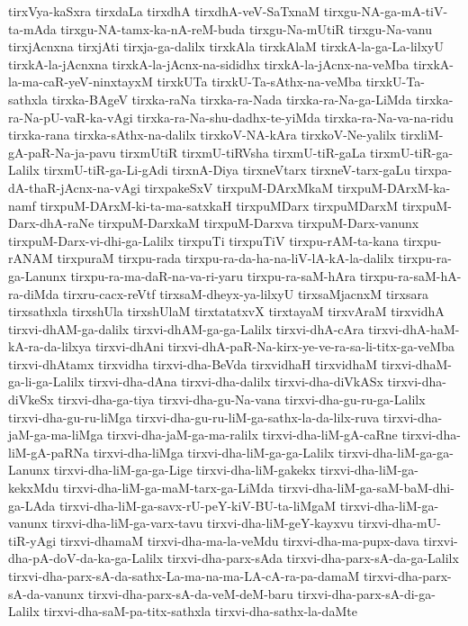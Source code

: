 {tirxVya-kaSxra
tirxdaLa
tirxdhA
tirxdhA-veV-SaTxnaM
tirxgu-NA-ga-mA-tiV-ta-mAda
tirxgu-NA-tamx-ka-nA-reM-buda
tirxgu-Na-mUtiR
tirxgu-Na-vanu
tirxjAcnxna
tirxjAti
tirxja-ga-dalilx
tirxkAla
tirxkAlaM
tirxkA-la-ga-La-lilxyU
tirxkA-la-jAcnxna
tirxkA-la-jAcnx-na-sididhx
tirxkA-la-jAcnx-na-veMba
tirxkA-la-ma-caR-yeV-ninxtayxM
tirxkUTa
tirxkU-Ta-sAthx-na-veMba
tirxkU-Ta-sathxla
tirxka-BAgeV
tirxka-raNa
tirxka-ra-Nada
tirxka-ra-Na-ga-LiMda
tirxka-ra-Na-pU-vaR-ka-vAgi
tirxka-ra-Na-shu-dadhx-te-yiMda
tirxka-ra-Na-va-na-ridu
tirxka-rana
tirxka-sAthx-na-dalilx
tirxkoV-NA-kAra
tirxkoV-Ne-yalilx
tirxliM-gA-paR-Na-ja-pavu
tirxmUtiR
tirxmU-tiRVsha
tirxmU-tiR-gaLa
tirxmU-tiR-ga-Lalilx
tirxmU-tiR-ga-Li-gAdi
tirxnA-Diya
tirxneVtarx
tirxneV-tarx-gaLu
tirxpa-dA-thaR-jAcnx-na-vAgi
tirxpakeSxV
tirxpuM-DArxMkaM
tirxpuM-DArxM-ka-namf
tirxpuM-DArxM-ki-ta-ma-satxkaH
tirxpuMDarx
tirxpuMDarxM
tirxpuM-Darx-dhA-raNe
tirxpuM-DarxkaM
tirxpuM-Darxva
tirxpuM-Darx-vanunx
tirxpuM-Darx-vi-dhi-ga-Lalilx
tirxpuTi
tirxpuTiV
tirxpu-rAM-ta-kana
tirxpu-rANAM
tirxpuraM
tirxpu-rada
tirxpu-ra-da-ha-na-liV-lA-kA-la-dalilx
tirxpu-ra-ga-Lanunx
tirxpu-ra-ma-daR-na-va-ri-yaru
tirxpu-ra-saM-hAra
tirxpu-ra-saM-hA-ra-diMda
tirxru-cacx-reVtf
tirxsaM-dheyx-ya-lilxyU
tirxsaMjacnxM
tirxsara
tirxsathxla
tirxshUla
tirxshUlaM
tirxtatatxvX
tirxtayaM
tirxvAraM
tirxvidhA
tirxvi-dhAM-ga-dalilx
tirxvi-dhAM-ga-ga-Lalilx
tirxvi-dhA-cAra
tirxvi-dhA-haM-kA-ra-da-lilxya
tirxvi-dhAni
tirxvi-dhA-paR-Na-kirx-ye-ve-ra-sa-li-titx-ga-veMba
tirxvi-dhAtamx
tirxvidha
tirxvi-dha-BeVda
tirxvidhaH
tirxvidhaM
tirxvi-dhaM-ga-li-ga-Lalilx
tirxvi-dha-dAna
tirxvi-dha-dalilx
tirxvi-dha-diVkASx
tirxvi-dha-diVkeSx
tirxvi-dha-ga-tiya
tirxvi-dha-gu-Na-vana
tirxvi-dha-gu-ru-ga-Lalilx
tirxvi-dha-gu-ru-liMga
tirxvi-dha-gu-ru-liM-ga-sathx-la-da-lilx-ruva
tirxvi-dha-jaM-ga-ma-liMga
tirxvi-dha-jaM-ga-ma-ralilx
tirxvi-dha-liM-gA-caRne
tirxvi-dha-liM-gA-paRNa
tirxvi-dha-liMga
tirxvi-dha-liM-ga-ga-Lalilx
tirxvi-dha-liM-ga-ga-Lanunx
tirxvi-dha-liM-ga-ga-Lige
tirxvi-dha-liM-gakekx
tirxvi-dha-liM-ga-kekxMdu
tirxvi-dha-liM-ga-maM-tarx-ga-LiMda
tirxvi-dha-liM-ga-saM-baM-dhi-ga-LAda
tirxvi-dha-liM-ga-savx-rU-peY-kiV-BU-ta-liMgaM
tirxvi-dha-liM-ga-vanunx
tirxvi-dha-liM-ga-varx-tavu
tirxvi-dha-liM-geY-kayxvu
tirxvi-dha-mU-tiR-yAgi
tirxvi-dhamaM
tirxvi-dha-ma-la-veMdu
tirxvi-dha-ma-pupx-dava
tirxvi-dha-pA-doV-da-ka-ga-Lalilx
tirxvi-dha-parx-sAda
tirxvi-dha-parx-sA-da-ga-Lalilx
tirxvi-dha-parx-sA-da-sathx-La-ma-na-ma-LA-cA-ra-pa-damaM
tirxvi-dha-parx-sA-da-vanunx
tirxvi-dha-parx-sA-da-veM-deM-baru
tirxvi-dha-parx-sA-di-ga-Lalilx
tirxvi-dha-saM-pa-titx-sathxla
tirxvi-dha-sathx-la-daMte
}
